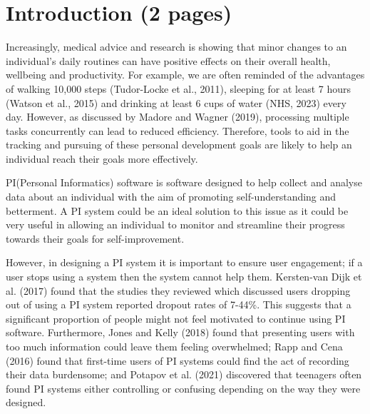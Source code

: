 \documentclass[12pt]{article}
\begin{document}
\section{Introduction (2 pages)}
Increasingly, medical advice and research is showing that minor changes to an individual’s daily routines can have positive effects on their overall health, wellbeing and productivity. For example, we are often reminded of the advantages of walking 10,000 steps (Tudor-Locke et al., 2011), sleeping for at least 7 hours (Watson et al., 2015) and drinking at least 6 cups of water (NHS, 2023) every day. However, as discussed by Madore and Wagner (2019), processing multiple tasks concurrently can lead to reduced efficiency. Therefore, tools to aid in the tracking and pursuing of these personal development goals are likely to help an individual reach their goals more effectively.\par

PI(Personal Informatics) software is software designed to help collect and analyse data about an individual with the aim of promoting self-understanding and betterment. A PI system could be an ideal solution to this issue as it could be very useful in allowing an individual to monitor and streamline their progress towards their goals for self-improvement.\par

However, in designing a PI system it is important to ensure user engagement; if a user stops using a system then the system cannot help them. Kersten-van Dijk et al. (2017) found that the studies they reviewed which discussed users dropping out of using a PI system reported dropout rates of 7-44\%. This suggests that a significant proportion of people might not feel motivated to continue using PI software. Furthermore, Jones and Kelly (2018) found that presenting users with too much information could leave them feeling overwhelmed; Rapp and Cena (2016) found that first-time users of PI systems could find the act of recording their data burdensome; and Potapov et al. (2021) discovered that teenagers often found PI systems either controlling or confusing depending on the way they were designed.\par
\end{document}

